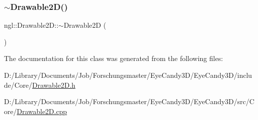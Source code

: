 \mbox{\label{classngl_1_1_drawable2_d_a806b81514a9bf7761f1099390b0a78a2}} 
\subsubsection{\texorpdfstring{$\sim$\+Drawable2\+D()}{~Drawable2D()}}
{\footnotesize\ttfamily ngl\+::\+Drawable2\+D\+::$\sim$\+Drawable2D (\begin{DoxyParamCaption}{ }\end{DoxyParamCaption})\hspace{0.3cm}{\ttfamily [virtual]}}



The documentation for this class was generated from the following files\+:\begin{DoxyCompactItemize}
\item 
D\+:/\+Library/\+Documents/\+Job/\+Forschungsmaster/\+Eye\+Candy3\+D/\+Eye\+Candy3\+D/include/\+Core/\mbox{\hyperlink{_drawable2_d_8h}{Drawable2\+D.\+h}}\item 
D\+:/\+Library/\+Documents/\+Job/\+Forschungsmaster/\+Eye\+Candy3\+D/\+Eye\+Candy3\+D/src/\+Core/\mbox{\hyperlink{_drawable2_d_8cpp}{Drawable2\+D.\+cpp}}\end{DoxyCompactItemize}
